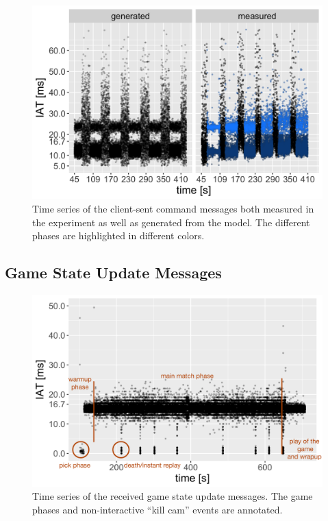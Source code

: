 \begin{figure}[t]
	\centering
	\includegraphics[width=1.0\columnwidth]{images/command-ts-annotated.png}
	\caption{Time series of the client-sent command messages both measured in the experiment as well as generated from the model. The different phases are highlighted in different colors.}
\label{fig:command-timeseries}
\end{figure}



\subsection{Game State Update Messages}

	\begin{figure}[t]
		\centering
		\includegraphics[width=1.0\columnwidth]{images/update-ts-annotated.pdf}
		\caption{Time series of the received game state update messages. The game phases and non-interactive ``kill cam'' events are annotated.}
	\label{fig:update-timeseries}
	\end{figure}

